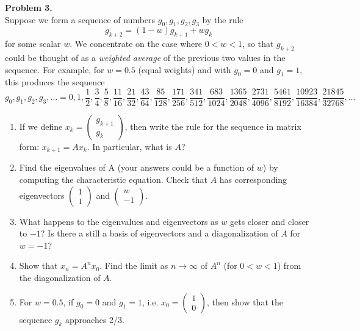 \documentclass[11pt]{article}
\begin{document}
\noindent \textbf{Problem 3.}\\
Suppose we form a sequence of numbers $g_0,g_1,g_2,g_3$ by the rule
$$ g_{k+2} = (1-w) g_{k+1} + w g_k $$
for some scalar $w$.  We concentrate on the case where $0 < w < 1$, so that $g_{k+2}$ could be thought of as a \emph{weighted average} of the previous two values in the sequence.  For example, for $w = 0.5$ (equal weights) and with $g_0=0$ and $g_1 = 1$, this produces the sequence
$$ g_0,g_1,g_2,g_3,\ldots = 0, 1, \frac{1}{2}, \frac{3}{4}, \frac{5}{8}, \frac{11}{16}, \frac{21}{32}, \frac{43}{64}, \frac{85}{128}, \frac{171}{256}, \frac{341}{512}, \frac{683}{1024}, \frac{1365}{2048}, \frac{2731}{4096}, \frac{5461}{8192}, \frac{10923}{16384}, \frac{21845}{32768}, \ldots $$
\begin{enumerate}
\item If we define $x_k = \begin{pmatrix} g_{k+1} \\ g_k \end{pmatrix}$, then write the rule for the sequence in matrix form: $x_{k+1} = A x_k$.  In particular, what is $A$?
\item Find the eigenvalues of A (your answers could be a function of $w$) by computing the characteristic equation. Check that $A$ has corresponding eigenvectors $\begin{pmatrix} 1 \\ 1 \end{pmatrix}$ and $\begin{pmatrix} w \\ -1 \end{pmatrix}$.
\item What happens to the eigenvalues and eigenvectors as $w$ gets closer and closer to $-1$?  Is there a still a basis of eigenvectors and a diagonalization of $A$ for $w=-1$?
\item  Show that $x_n = A^n x_0$. Find the limit as $n\to\infty$ of $A^n$ (for $0 < w < 1$) from the diagonalization of $A$. 
\item For $w=0.5$, if $g_0 = 0$ and $g_1 = 1$, i.e. $x_0 = \begin{pmatrix} 1 \\ 0 \end{pmatrix}$, then show that the sequence $g_k$ approaches 2/3.
\end{enumerate} 

\
\end{document}
